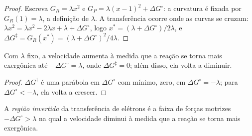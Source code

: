 \begin{proof}
Escreva $G_R = \lambda x^2$ e $G_P = \lambda(x - 1)^2 + \Delta G^\circ$: a curvatura é fixada por $G_R(1) = \lambda$, a
definição de $\lambda$. A transferência ocorre onde as curvas se cruzam: $\lambda x^2 = \lambda x^2 - 2\lambda x + \lambda +
\Delta G^\circ$, logo $x^\ast = (\lambda + \Delta G^\circ)/2\lambda$, e $\Delta G^{\ddagger} = G_R(x^\ast) = (\lambda + \Delta G^\circ)^2/4\lambda$.
\end{proof}

\begin{corollary}\label{cor:b3:complex-mechanisms:inverted}
Com $\lambda$ fixo, a velocidade aumenta à medida que a reação se torna mais exergônica até
$-\Delta G^\circ = \lambda$, onde $\Delta G^{\ddagger} = 0$; além disso, ela volta a diminuir.
\end{corollary}

\begin{proof}
$\Delta G^{\ddagger}$ é uma parábola em $\Delta G^\circ$ com mínimo, zero, em $\Delta G^\circ = -\lambda$; para $\Delta G^\circ < -\lambda$, ela volta a
crescer.
\end{proof}

\begin{definition}\label{def:b3:complex-mechanisms:inverted}
A \emph{região invertida} da transferência de elétrons é a
faixa de forças motrizes $-\Delta G^\circ > \lambda$ na qual a velocidade diminui à medida que a reação se torna
mais exergônica.
\end{definition}

